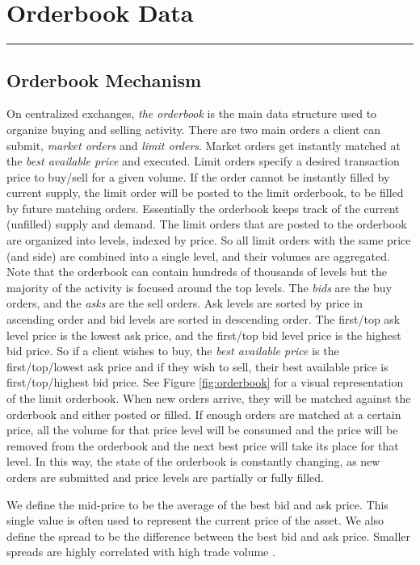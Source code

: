 \chapter{Orderbook Data}
\hrule
\vspace{40pt}

\section{Orderbook Mechanism}
On centralized exchanges, \textit{the orderbook} is the main data structure used to
organize buying and selling activity. 
There are two main orders a client can submit, \textit{market orders} and \textit{limit orders}.
Market orders get instantly matched at the \textit{best available price}
and executed. Limit orders specify a desired transaction price to buy/sell for a given volume.
If the order cannot be instantly filled by current supply, the limit order will
be posted to the limit orderbook, to be filled by future matching orders.
Essentially the orderbook keeps track of the current (unfilled) supply and demand.
The limit orders that are posted to the orderbook are organized into levels,
indexed by price. So all limit orders with the same price (and side) are 
combined into a single level, and their volumes are aggregated.
Note that the orderbook can contain hundreds of thousands of levels but the majority
of the activity is focused around the top levels.
The \textit{bids} are the buy orders, and the \textit{asks}
are the sell orders. Ask levels are sorted by price in ascending order and 
bid levels are sorted in descending order. The first/top ask level price is the
lowest ask price, and the first/top bid level price is the highest bid price. 
So if a client wishes to buy, the \textit{best available price} is the first/top/lowest ask price
and if they wish to sell, their best available price is first/top/highest bid price.
See Figure \ref{fig:orderbook} for a visual representation of the limit orderbook.
When new orders arrive, they will be matched against the orderbook and either posted or filled.
If enough orders are matched at a certain price, all the volume for that price level 
will be consumed and the price will be removed from the orderbook and the next best price will take its place for that level.
In this way, the state of the orderbook is constantly changing, as new orders are submitted
and price levels are partially or fully filled.

We define the mid-price to be the average of the best bid and ask price.
This single value is often used to represent the current price of the asset.
We also define the spread to be the difference between the best bid and ask price.
Smaller spreads are highly correlated with high trade volume \cite{ARITRA2021}.

